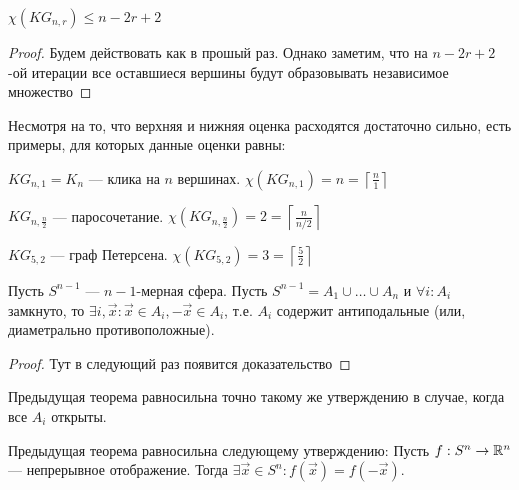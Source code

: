 \begin{note}
    \(\chi(KG_{n, r}) \le n - 2r + 2\)
\end{note}
\begin{proof}
    Будем действовать как в прошый раз. Однако заметим, что на \(n - 2r + 2\)-ой итерации все оставшиеся вершины будут образовывать независимое множество
\end{proof}

Несмотря на то, что верхняя и нижняя оценка расходятся достаточно сильно, есть примеры, для которых данные оценки равны:

\begin{example}
    \(KG_{n, 1} = K_n\) --- клика на \(n\) вершинах. \(\chi(KG_{n, 1}) = n = \left\lceil\frac{n}{1}\right\rceil\)
\end{example}

\begin{example}
    \(KG_{n, \frac{n}{2}}\) --- паросочетание. \(\chi(KG_{n, \frac{n}{2}}) = 2 = \left\lceil\frac{n}{n / 2}\right\rceil\)
\end{example}

\begin{example}
    \(KG_{5, 2}\) --- граф Петерсена. \(\chi(KG_{5, 2}) = 3 = \left\lceil\frac{5}{2}\right\rceil\)
\end{example}

\begin{theorem}
    Пусть \(S^{n - 1}\) --- \(n - 1\)-мерная сфера. Пусть \(S^{n - 1} = A_1 \cup\dots \cup A_n\) и \(\forall i: A_i\) замкнуто, то \(\exists i, \vec{x}: \vec{x} \in A_i, -\vec{x} \in A_i\), т.е. \(A_i\) содержит антиподальные (или, диаметрально противоположные).
\end{theorem}
\begin{proof}
    Тут в следующий раз появится доказательство
\end{proof}

\begin{note}
    Предыдущая теорема равносильна точно такому же утверждению в случае, когда все \(A_i\) открыты.
\end{note}

\begin{note}
    Предыдущая теорема равносильна следующему утверждению: Пусть \(f: S^n \rightarrow \mathbb{R}^n\) --- непрерывное отображение. Тогда \(\exists \vec{x} \in S^n: f(\vec{x}) = f(-\vec{x})\).
\end{note}

